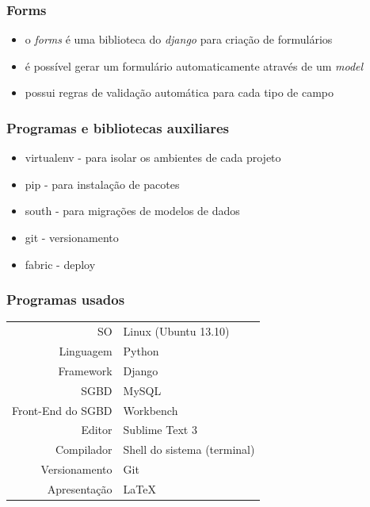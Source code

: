 \documentclass[aspectratio=169]{beamer}
\begin{document}
\begin{frame}\frametitle{Forms}
\begin{itemize}
	\item o \emph{forms} \'e uma biblioteca do \emph{django} para cria\c c\~ao de formul\'arios
	\item \'e poss\'ivel gerar um formul\'ario automaticamente atrav\'es de um \emph{model}
	\item possui regras de valida\c c\~ao autom\'atica para cada tipo de campo
\end{itemize}
\end{frame}

\begin{frame}\frametitle{Programas e bibliotecas auxiliares}
\begin{itemize}
	\item virtualenv - para isolar os ambientes de cada projeto
	\item pip - para instala\c c\~ao de pacotes
	\item south - para migra\c c\~oes de modelos de dados
	\item git - versionamento
	\item fabric - deploy
\end{itemize}
\end{frame}

\begin{frame}\frametitle{Programas usados}
	\begin{center}
      \begin{tabular}{r|l}
		SO & Linux (Ubuntu 13.10) \\
		Linguagem & Python \\
		Framework & Django \\
		SGBD & MySQL \\
		Front-End do SGBD & Workbench \\
		Editor & Sublime Text 3 \\
		Compilador & Shell do sistema (terminal) \\
		Versionamento & Git \\
		Apresenta\c c\~ao & LaTeX \\
      \end{tabular}
    \end{center}
\end{frame}
\end{document}
